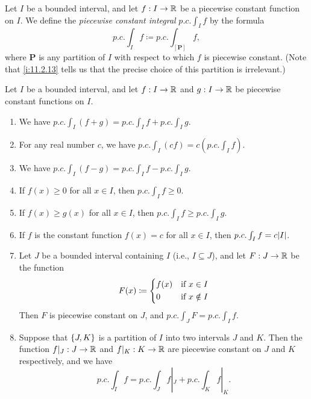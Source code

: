 \begin{defn}\label{i:11.2.14}
  Let \(I\) be a bounded interval, and let \(f : I \to \mathbb{R}\) be a piecewise constant function on \(I\).
  We define the \emph{piecewise constant integral} \(p.c. \int_I f\) by the formula
  \[
    p.c. \int_I f \coloneqq p.c. \int_{[\mathbf{P}]} f,
  \]
  where \(\mathbf{P}\) is any partition of \(I\) with respect to which \(f\) is piecewise constant.
  (Note that \cref{i:11.2.13} tells us that the precise choice of this partition is irrelevant.)
\end{defn}

\setcounter{thm}{15}
\begin{thm}\label{i:11.2.16}
  Let \(I\) be a bounded interval, and let \(f : I \to \mathbb{R}\) and \(g : I \to \mathbb{R}\) be piecewise constant functions on \(I\).
  \begin{enumerate}
    \item We have \(p.c. \int_I (f + g) = p.c. \int_I f + p.c. \int_I g\).
    \item For any real number \(c\), we have \(p.c. \int_I (cf) = c (p.c. \int_I f)\).
    \item We have \(p.c. \int_I (f - g) = p.c. \int_I f - p.c. \int_I g\).
    \item If \(f(x) \geq 0\) for all \(x \in I\), then \(p.c. \int_I f \geq 0\).
    \item If \(f(x) \geq g(x)\) for all \(x \in I\), then \(p.c. \int_I f \geq p.c. \int_I g\).
    \item If \(f\) is the constant function \(f(x) = c\) for all \(x \in I\), then \(p.c. \int_I f = c \abs{I}\).
    \item Let \(J\) be a bounded interval containing \(I\) (i.e., \(I \subseteq J\)), and let \(F : J \to \mathbb{R}\) be the function
          \[
            F(x) \coloneqq \begin{dcases}
              f(x) & \text{if } x \in I    \\
              0    & \text{if } x \notin I
            \end{dcases}
          \]
          Then \(F\) is piecewise constant on \(J\), and \(p.c. \int_J F = p.c. \int_I f\).
    \item Suppose that \(\left\lbrace J, K\right\rbrace\) is a partition of \(I\) into two intervals \(J\) and \(K\).
          Then the function \(f|_J : J \to \mathbb{R}\) and \(f|_K : K \to \mathbb{R}\) are piecewise constant on \(J\) and \(K\) respectively, and we have
          \[
            p.c. \int_I f = p.c. \int_J f|_J + p.c. \int_K f|_K.
          \]
  \end{enumerate}
\end{thm}

